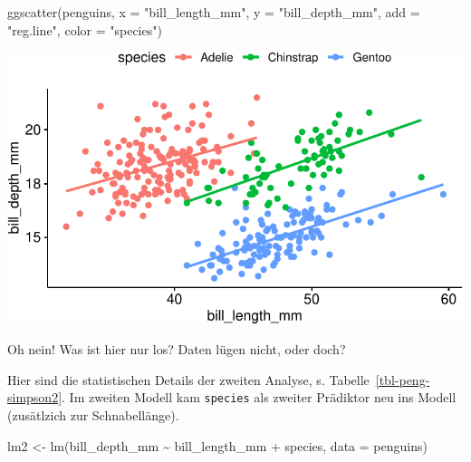 \documentclass[
  letterpaper,
]{scrbook}
\newenvironment{Shaded}{\begin{snugshade}}{\end{snugshade}}
\newcommand{\AttributeTok}[1]{\textcolor[rgb]{0.40,0.45,0.13}{#1}}
\newcommand{\FunctionTok}[1]{\textcolor[rgb]{0.28,0.35,0.67}{#1}}
\newcommand{\NormalTok}[1]{\textcolor[rgb]{0.00,0.23,0.31}{#1}}
\newcommand{\OtherTok}[1]{\textcolor[rgb]{0.00,0.23,0.31}{#1}}
\newcommand{\SpecialCharTok}[1]{\textcolor[rgb]{0.37,0.37,0.37}{#1}}
\newcommand{\StringTok}[1]{\textcolor[rgb]{0.13,0.47,0.30}{#1}}
\theoremstyle{definition}
\theoremstyle{definition}
\theoremstyle{definition}
\theoremstyle{remark}
\begin{document}
\begin{Shaded}
\begin{Highlighting}[]
\FunctionTok{ggscatter}\NormalTok{(penguins, }\AttributeTok{x =} \StringTok{"bill\_length\_mm"}\NormalTok{, }\AttributeTok{y =} \StringTok{"bill\_depth\_mm"}\NormalTok{, }
          \AttributeTok{add =} \StringTok{"reg.line"}\NormalTok{, }\AttributeTok{color =} \StringTok{"species"}\NormalTok{)}
\end{Highlighting}
\end{Shaded}

\begin{center}
\includegraphics[width=0.7\linewidth,height=\textheight,keepaspectratio]{090-regression2_files/figure-pdf/unnamed-chunk-65-1.pdf}
\end{center}

Oh nein! Was ist hier nur los? Daten lügen nicht, oder doch?

Hier sind die statistischen Details der zweiten Analyse, s.
Tabelle~\ref{tbl-peng-simpson2}. Im zweiten Modell kam \texttt{species}
als zweiter Prädiktor neu ins Modell (zusätlzich zur Schnabellänge).

\begin{Shaded}
\begin{Highlighting}[]
\NormalTok{lm2 }\OtherTok{\textless{}{-}} \FunctionTok{lm}\NormalTok{(bill\_depth\_mm }\SpecialCharTok{\textasciitilde{}}\NormalTok{ bill\_length\_mm }\SpecialCharTok{+}\NormalTok{ species, }\AttributeTok{data =}\NormalTok{ penguins)}
\end{Highlighting}
\end{Shaded}
\end{document}
